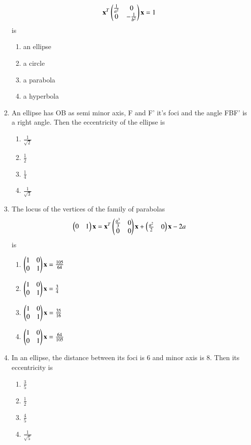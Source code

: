 \documentclass[journal,12pt,twocolumn]{IEEEtran}
\begin{document}
\begin{enumerate}[label=\arabic*]
    \begin{align}
    \mathbf{x}^T\begin{pmatrix}\frac{1}{a^2}&0\\0&-\frac{1}{b^2}\end{pmatrix}\mathbf{x}=1
    \end{align} is 
    \begin{enumerate}
    \item an ellipse
    \item a circle 
    \item a parabola
    \item a hyperbola 
    \end{enumerate}
    \item An ellipse has OB as semi minor axis, F and F' it's foci and the angle FBF' is a right angle. Then the eccentricity of the ellipse is
    \begin{enumerate}
    \item $\frac{1}{\sqrt{2}}$
    \item $\frac{1}{2}$ 
    \item $\frac{1}{4}$
    \item $\frac{1}{\sqrt{3}}$ 
    \end{enumerate}
    \item The locus of the vertices of the family of parabolas
    \begin{align}
    \begin{pmatrix}0&1\end{pmatrix}\mathbf{x}=\mathbf{x}^T\begin{pmatrix}\frac{a^3}{3}&0\\0&0\end{pmatrix} \mathbf{x}+\begin{pmatrix}\frac{a^2}{2}&0\end{pmatrix} \mathbf{x}-2a
    \end{align} is
    \begin{enumerate}
    \item $\begin{pmatrix}1&0\\0&1\end{pmatrix}\mathbf{x}=\frac{105}{64}$
    \item $\begin{pmatrix}1&0\\0&1\end{pmatrix}\mathbf{x}=\frac{3}{4}$
    \item $\begin{pmatrix}1&0\\0&1\end{pmatrix}\mathbf{x}=\frac{35}{16}$
    \item $\begin{pmatrix}1&0\\0&1\end{pmatrix}\mathbf{x}=\frac{64}{105}$ 
    \end{enumerate}
    \item In an ellipse, the distance between its foci is 6 and minor axis is 8. Then its eccentricity is
    \begin{enumerate}
    \item $\frac{3}{5}$
    \item $\frac{1}{2}$ 
    \item $\frac{4}{5}$
    \item $\frac{1}{\sqrt{5}}$ 

\end{enumerate}
\end{enumerate}
\end{document}
